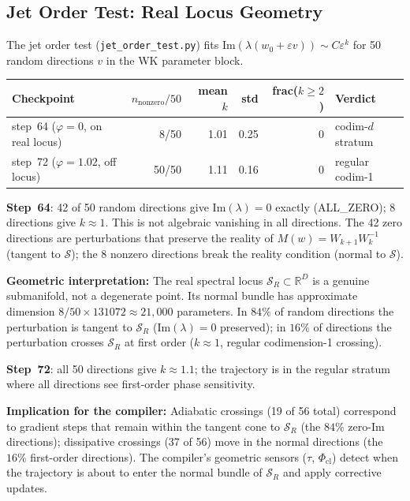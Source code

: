 \documentclass[11pt]{amsart}
\begin{document}
\subsection{Jet Order Test: Real Locus Geometry}
\label{sec:jet_order}

The jet order test (\texttt{jet\_order\_test.py}) fits
$\mathrm{Im}(\lambda(w_0+\varepsilon v)) \sim C\varepsilon^k$
for 50 random directions $v$ in the WK parameter block.

\begin{center}
\small
\begin{tabular}{@{}lrrrrl@{}}
\toprule
Checkpoint & $n_\mathrm{nonzero}/50$ & mean $k$ & std & frac($k\geq 2$) & Verdict \\
\midrule
step~64 ($\varphi=0$, on real locus)
  & 8/50 & 1.01 & 0.25 & 0 & codim-$d$ stratum \\
step~72 ($\varphi=1.02$, off locus)
  & 50/50 & 1.11 & 0.16 & 0 & regular codim-1 \\
\bottomrule
\end{tabular}
\end{center}

\textbf{Step~64}: 42 of 50 random directions give $\mathrm{Im}(\lambda) = 0$
exactly (ALL\_ZERO); 8 directions give $k \approx 1$.
This is not algebraic vanishing in all directions.
The 42 zero directions are perturbations that preserve the reality of
$M(w) = W_{k+1}W_k^{-1}$ (tangent to $\mathcal{S}$);
the 8 nonzero directions break the reality condition (normal to $\mathcal{S}$).

\textbf{Geometric interpretation:}
The real spectral locus $\mathcal{S}_R \subset \mathbb{R}^D$ is a genuine
submanifold, not a degenerate point.
Its normal bundle has approximate dimension
$8/50 \times 131072 \approx 21{,}000$ parameters.
In $84\%$ of random directions the perturbation is tangent to $\mathcal{S}_R$
($\mathrm{Im}(\lambda) = 0$ preserved);
in $16\%$ of directions the perturbation crosses $\mathcal{S}_R$ at
first order ($k \approx 1$, regular codimension-1 crossing).

\textbf{Step~72}: all 50 directions give $k \approx 1.1$;
the trajectory is in the regular stratum where all directions see
first-order phase sensitivity.

\textbf{Implication for the compiler:}
Adiabatic crossings (19 of 56 total) correspond to gradient steps
that remain within the tangent cone to $\mathcal{S}_R$
(the $84\%$ zero-Im directions);
dissipative crossings (37 of 56) move in the normal directions
(the $16\%$ first-order directions).
The compiler's geometric sensors ($\tau$, $\Phi_\mathrm{cl}$)
detect when the trajectory is about to enter the normal bundle of
$\mathcal{S}_R$ and apply corrective updates.
\end{document}
